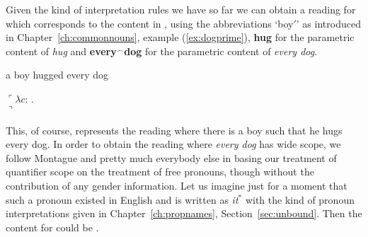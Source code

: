 Given the kind of interpretation rules we have so far we can obtain a
reading for  which corresponds to the 
content 
in , using the abbreviations `boy$'$' as
introduced in Chapter~\ref{ch:commonnouns}, example
(\ref{ex:dogprime}), \textbf{hug} for the parametric content of
\textit{hug} and \textbf{every}$^\frown$\textbf{dog} for the
parametric content of \textit{every dog}.
\begin{ex} 
\begin{subex} 
 
\item a boy hugged every dog 
 
\item %
  $\ulcorner\lambda c$: . \\
  \hspace*{2em}$\urcorner$
 
\end{subex} 
   
\end{ex} 
This, of course, represents the reading where there is a boy such that
he hugs every dog.  %
In order to obtain the reading where \textit{every dog} has wide
scope, we follow Montague and pretty much everybody else in basing our
treatment of quantifier scope on the treatment of free pronouns,
though without the contribution of any gender information.  Let us
imagine just for a moment that such a pronoun existed in English and
is written as \textit{it$^*$} with the kind of pronoun interpretations
given in Chapter~\ref{ch:propnames}, Section~\ref{sec:unbound}.  Then the content for  could be
.



